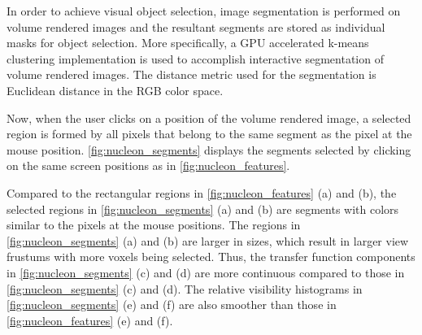 \documentclass[twoside,twocolumn,10pt]{article}
\begin{document}
In order to achieve visual object selection, image segmentation is performed on volume rendered images and the resultant segments are stored as individual masks for object selection. More specifically, a GPU accelerated k-means clustering implementation is used to accomplish interactive segmentation of volume rendered images. The distance metric used for the segmentation is Euclidean distance in the RGB color space.

Now, when the user clicks on a position of the volume rendered image, a selected region is formed by all pixels that belong to the same segment as the pixel at the mouse position.
\autoref{fig:nucleon_segments} displays the segments selected by clicking on the same screen positions as in \autoref{fig:nucleon_features}.

Compared to the rectangular regions in \autoref{fig:nucleon_features} (a) and (b), the selected regions in \autoref{fig:nucleon_segments} (a) and (b) are segments with colors similar to the pixels at the mouse positions. The regions in \autoref{fig:nucleon_segments} (a) and (b) are larger in sizes, which result in larger view frustums with more voxels being selected. Thus, the transfer function components in \autoref{fig:nucleon_segments} (c) and (d) are more continuous compared to those in \autoref{fig:nucleon_segments} (c) and (d). The relative visibility histograms in \autoref{fig:nucleon_segments} (e) and (f) are also smoother than those in \autoref{fig:nucleon_features} (e) and (f).
\end{document}
